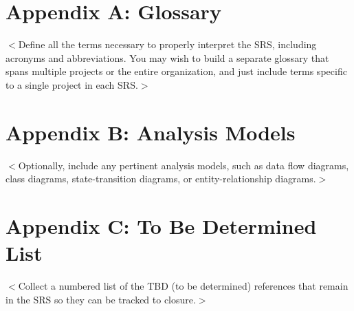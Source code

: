 \documentclass{scrreprt}
\begin{document}
\section{Appendix A: Glossary}
$<$Define all the terms necessary to properly interpret the SRS, including
acronyms and abbreviations. You may wish to build a separate glossary that spans
multiple projects or the entire organization, and just include terms specific to
a single project in each SRS.$>$

\section{Appendix B: Analysis Models}
$<$Optionally, include any pertinent analysis models, such as data flow
diagrams, class diagrams, state-transition diagrams, or entity-relationship
diagrams.$>$

\section{Appendix C: To Be Determined List}
$<$Collect a numbered list of the TBD (to be determined) references that remain
in the SRS so they can be tracked to closure.$>$
\end{document}
